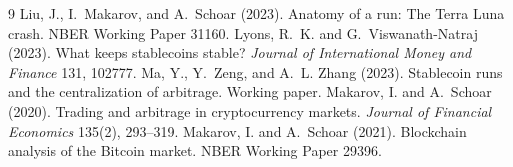 \documentclass[11pt]{article}
\begin{document}

\begin{thebibliography}{9}
Liu, J., I.~Makarov, and A.~Schoar (2023). Anatomy of a run: The Terra Luna crash. NBER Working Paper 31160.
Lyons, R.~K. and G.~Viswanath-Natraj (2023). What keeps stablecoins stable? \emph{Journal of International Money and Finance} 131, 102777.
Ma, Y., Y.~Zeng, and A.~L. Zhang (2023). Stablecoin runs and the centralization of arbitrage. Working paper.
Makarov, I. and A.~Schoar (2020). Trading and arbitrage in cryptocurrency markets. \emph{Journal of Financial Economics} 135(2), 293--319.
Makarov, I. and A.~Schoar (2021). Blockchain analysis of the Bitcoin market. NBER Working Paper 29396.
\end{thebibliography}
\end{document}
